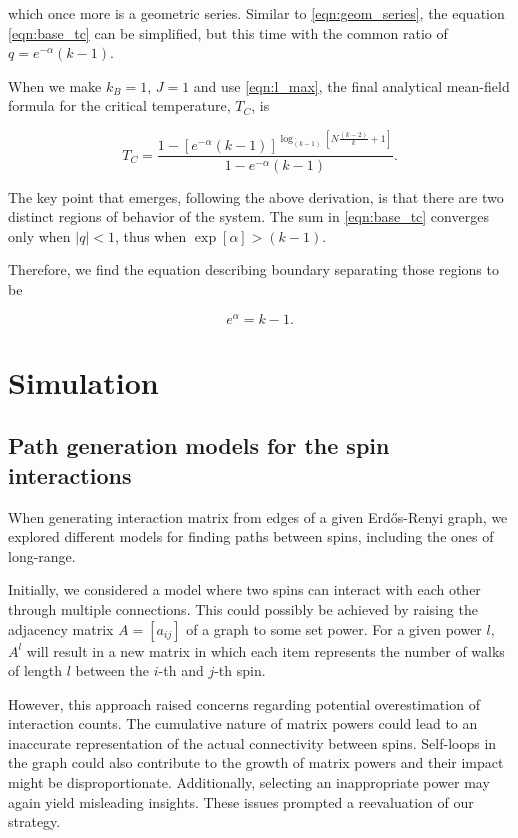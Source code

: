 \documentclass[11pt,a4paper]{article}
\begin{document}
which once more is a geometric series. Similar to \eqref{eqn:geom_series}, the equation \eqref{eqn:base_tc} can be simplified, but this time with the common ratio of $q=e^{-\alpha}(k-1)$.

When we make $k_B=1$, $J=1$ and use \eqref{eqn:l_max}, the final analytical mean-field formula for the critical temperature, $T_C$, is

\begin{equation}
    T_C = \frac{1 - [e^{-\alpha}(k-1)]^{\log_{(k-1)}{\left[N\frac{(k-2)}{k} + 1\right]}}}{1 - e^{-\alpha}(k-1)}.
\end{equation}

The key point that emerges, following the above derivation, is that there are two distinct regions of behavior of the system. The sum in \eqref{eqn:base_tc} converges only when $|q|<1$, thus when $\exp[\alpha] > (k-1)$.

Therefore, we find the equation describing boundary separating those regions to be

\begin{equation}
    e^\alpha = k-1.
\end{equation}

\section{Simulation}

\subsection{Path generation models for the spin interactions}

When generating interaction matrix from edges of a given Erdős-Renyi graph, we explored different models for finding paths between spins, including the ones of long-range.

Initially, we considered a model where two spins can interact with each other through multiple connections. This could possibly be achieved by raising the adjacency matrix $A=[a_{ij}]$ of a graph to some set power. For a given power $l$, $A^l$ will result in a new matrix in which each item represents the number of walks of length $l$ between the $i$-th and $j$-th spin.

However, this approach raised concerns regarding potential overestimation of interaction counts. The cumulative nature of matrix powers could lead to an inaccurate representation of the actual connectivity between spins. Self-loops in the graph could also contribute to the growth of matrix powers and their impact might be disproportionate. Additionally, selecting an inappropriate power may again yield misleading insights. These issues prompted a reevaluation of our strategy.
\end{document}

